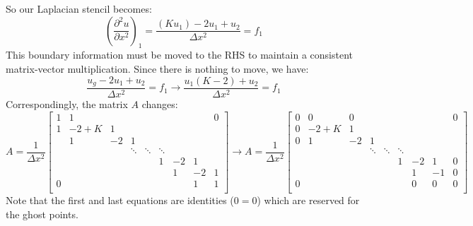 \documentclass[landscape]{article}
\begin{document}
So our Laplacian stencil becomes:
\begin{equation}
   \left(\frac{\partial^2 u}{\partial x^2}\right)_{1} =
   \frac{(K u_1) - 2 u_1 + u_{2}}{\Delta x^2} = f_1
\end{equation}
This boundary information must be moved to the RHS to maintain a consistent matrix-vector multiplication. Since there is nothing to move, we have:
\begin{equation}
   \frac{u_g - 2 u_1 + u_{2}}{\Delta x^2} = f_1
   \rightarrow
   \frac{u_1(K-2) + u_{2}}{\Delta x^2} = f_1
\end{equation}
Correspondingly, the matrix $A$ changes:
\[ A = \frac{1}{\Delta x^2} \left[\begin{array}{ccccccccc}
1  & 1     &           &           &           &           &           &         &  0 \\
1  & -2+K  & 1         &           &           &           &           &         &    \\
   & 1     & -2        & 1         &           &           &           &         &    \\
   &       &           & \ddots    & \ddots    & \ddots    &           &         &    \\
   &       &           &           &           & 1         & -2        & 1       &    \\
   &       &           &           &           &           &  1        & -2      &  1 \\
0  &       &           &           &           &           &           & 1       &  1 \\
\end{array} \right]
\rightarrow
A = \frac{1}{\Delta x^2} \left[\begin{array}{ccccccccc}
0  & 0     & 0         &           &           &           &           &         &  0 \\
0  & -2+K  & 1         &           &           &           &           &         &    \\
0  & 1     & -2        & 1         &           &           &           &         &    \\
   &       &           & \ddots    & \ddots    & \ddots    &           &         &    \\
   &       &           &           &           & 1         & -2        & 1       &  0 \\
   &       &           &           &           &           &  1        & -1      &  0 \\
0  &       &           &           &           &           &  0        & 0       &  0 \\
\end{array} \right]
\]
Note that the first and last equations are identities ($0=0$) which are reserved for the ghost points.
\end{document}
